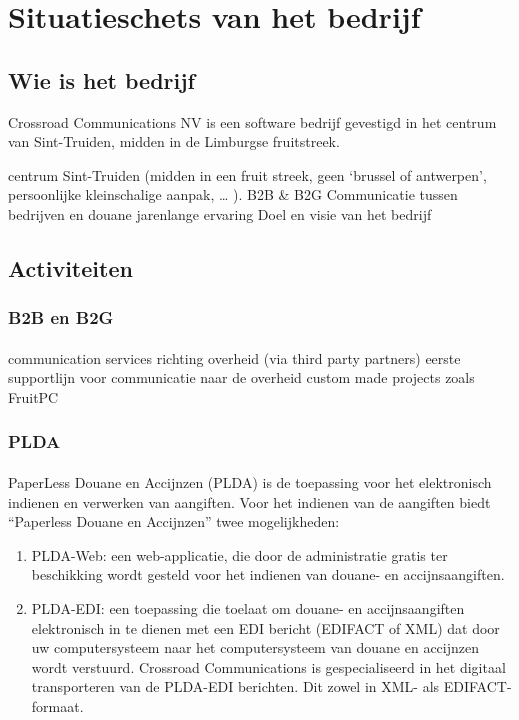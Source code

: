 \section {Situatieschets van het bedrijf}

\subsection {Wie is het bedrijf}

Crossroad Communications NV is een software bedrijf gevestigd in het centrum van
Sint-Truiden, midden in de Limburgse fruitstreek.

centrum Sint-Truiden (midden in een fruit streek, geen ‘brussel of antwerpen’,
persoonlijke kleinschalige aanpak, … ).
B2B \& B2G
Communicatie tussen bedrijven en douane
jarenlange ervaring
Doel en visie van het bedrijf


\subsection {Activiteiten}


\subsubsection {B2B en B2G}

\paragraph {} communication services richting overheid (via third party partners) eerste
supportlijn voor communicatie naar de overheid custom made projects zoals FruitPC


\subsubsection {PLDA}

\paragraph {} PaperLess Douane en Accijnzen (PLDA) is de toepassing voor het elektronisch
indienen en verwerken van aangiften. Voor het indienen van de aangiften biedt “Paperless
Douane en Accijnzen” twee mogelijkheden:

\begin{enumerate}
\item PLDA-Web: een web-applicatie, die door de administratie gratis ter beschikking wordt
gesteld voor het indienen van douane- en accijnsaangiften.

\item PLDA-EDI: een toepassing die toelaat om douane- en accijnsaangiften elektronisch in
te dienen met een EDI bericht (EDIFACT of XML) dat door uw computersysteem naar het
computersysteem van douane en accijnzen wordt verstuurd. Crossroad Communications is
gespecialiseerd in het digitaal transporteren van de PLDA-EDI berichten. Dit zowel in XML-
als EDIFACT-formaat.
\end{enumerate}


